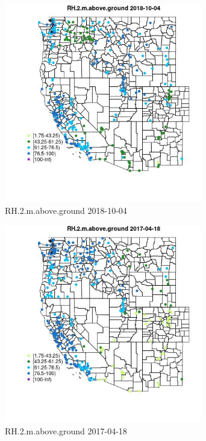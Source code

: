 \begin{figure} 
\centering  
\includegraphics[width=0.77\textwidth]{Code_Outputs/Report_ML_input_PM25_Step4_part_f_de_duplicated_aveswNAs_MapObsRH2maboveground2018-10-04.jpg} 
\caption{\label{fig:Report_ML_input_PM25_Step4_part_f_de_duplicated_aveswNAsMapObsRH2maboveground2018-10-04}RH.2.m.above.ground 2018-10-04} 
\end{figure} 
 

\begin{figure} 
\centering  
\includegraphics[width=0.77\textwidth]{Code_Outputs/Report_ML_input_PM25_Step4_part_f_de_duplicated_aveswNAs_MapObsRH2maboveground2017-04-18.jpg} 
\caption{\label{fig:Report_ML_input_PM25_Step4_part_f_de_duplicated_aveswNAsMapObsRH2maboveground2017-04-18}RH.2.m.above.ground 2017-04-18} 
\end{figure} 
 

